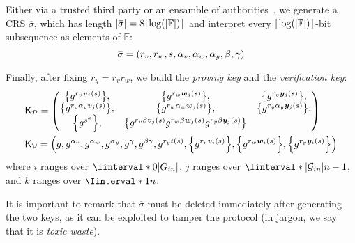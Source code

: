 Either via a trusted third party or an ensamble of authorities~\cite{GrothO2006}, we generate 
a CRS \(\overbar{\sigma}\), which has length 
\(\abs{\overbar{\sigma}} = 8\Ceil*{\call{\log}{\abs{\mathbb{F}}}}\) and interpret every 
\(\Ceil*{\call{\log}{\abs{\mathbb{F}}}}\)-bit subsequence as elements of \(\mathbb{F}\): 
\[\overbar{\sigma} = \Tuple{r_v, r_w, s, \alpha_v, \alpha_w, \alpha_y, \beta, \gamma}\]

Finally, after fixing \(r_y = r_{v}r_{w}\), we build the \emph{proving key} and the 
\emph{verification key}:
\begin{align*}
  & \ProverKey = 
  \begin{pmatrix*}
    \Set{g^{r_{v}\call{\bm{v}_j}{s}}}, &
    \Set{g^{r_{w}\call{\bm{w}_j}{s}}}, &
    \Set{g^{r_{y}\call{\bm{y}_j}{s}}}, \\
    \Set{g^{r_{v}\alpha_v\call{\bm{v}_j}{s}}}, &
    \Set{g^{r_{w}\alpha_w\call{\bm{w}_j}{s}}}, &
    \Set{g^{r_{y}\alpha_y\call{\bm{y}_j}{s}}}, \\
    \Set{g^{s^k}}, &
    \Set{g^{r_{v}{\beta}\call{\bm{v}_j}{s}}g^{r_{w}{\beta}\call{\bm{w}_j}{s}}g^{r_{y}{\beta}\call{\bm{y}_j}{s}}}
  \end{pmatrix*} \\
  & \VerifierKey = \Tuple{
    g, 
    g^{\alpha_v}, 
    g^{\alpha_w}, 
    g^{\alpha_y}, 
    g^{\gamma}, 
    g^{\beta\gamma}, 
    g^{r_{y}\call{t}{s}},
    \Set{g^{r_{v}\call{\bm{v}_i}{s}}}, 
    \Set{g^{r_{w}\call{\bm{w}_i}{s}}}, 
    \Set{g^{r_{y}\call{\bm{y}_i}{s}}}
  }
\end{align*}
where \(i\) ranges over \(\Iinterval*{0}{\abs{G_{in}}}\), \(j\) ranges over 
\(\Iinterval*{\abs{\mathcal{G}_{in}}}{n-1}\), and \(k\) ranges over \(\Iinterval*{1}{n}\).

It is important to remark that \(\overbar{\sigma}\) must be deleted immediately after generating 
the two keys, as it can be exploited to tamper the protocol 
(in jargon, we say that it is \emph{toxic waste}).

